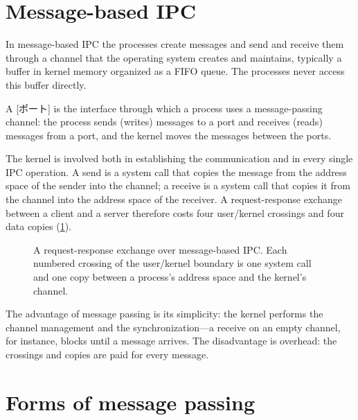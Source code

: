 \documentclass[../main.tex]{subfiles}
\begin{document}
\section{Message-based IPC}
\label{sec:l09-message}

In message-based IPC the processes create messages
and send and receive them through a channel that the operating system
creates and maintains, typically a buffer in kernel memory organized as a
FIFO queue.
The processes never access this buffer directly.

\begin{definition}[Port]
  A [ポート] is the interface through which a process uses a
  message-passing channel: the process sends (writes) messages to a port and
  receives (reads) messages from a port, and the kernel moves the messages
  between the ports.
\end{definition}

The kernel is involved both in establishing the communication and in every
single IPC operation.  A send is a system call that copies the message from
the address space of the sender into the channel; a receive is a system call
that copies it from the channel into the address space of the receiver.  A
request-response exchange between a client and a server therefore costs
four user/kernel crossings and four data copies
(\cref{fig:l09-message-ipc}).

\begin{figure}[htbp]
  \centering
  
  \caption{A request-response exchange over message-based IPC.  Each
    numbered crossing of the user/kernel boundary is one system call and one
    copy between a process's address space and the kernel's channel.}
  \label{fig:l09-message-ipc}
\end{figure}

The advantage of message passing is its simplicity: the kernel performs the
channel management and the synchronization---a receive on an empty channel,
for instance, blocks until a message arrives.  The disadvantage is overhead:
the crossings and copies are paid for every message.

\section{Forms of message passing}
\label{sec:l09-forms}
\end{document}
